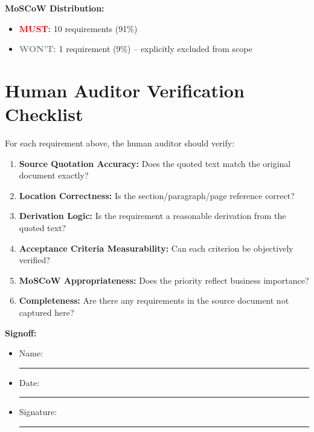 \vspace{1em}
\textbf{MoSCoW Distribution:}
\begin{itemize}
    \item \textcolor{red}{\textbf{MUST:}} 10 requirements (91\%)
    \item \textcolor{gray}{\textbf{WON'T:}} 1 requirement (9\%) -- explicitly excluded from scope
\end{itemize}

\section{Human Auditor Verification Checklist}
\label{sec:req-audit-checklist}

\begin{tcolorbox}[colback=yellow!10,colframe=yellow!50!black,title=\faIcon{clipboard-check} Auditor Verification Checklist]
For each requirement above, the human auditor should verify:

\begin{enumerate}[label=\faIcon{square}]
    \item \textbf{Source Quotation Accuracy:} Does the quoted text match the 
          original document exactly?
    \item \textbf{Location Correctness:} Is the section/paragraph/page reference correct?
    \item \textbf{Derivation Logic:} Is the requirement a reasonable derivation 
          from the quoted text?
    \item \textbf{Acceptance Criteria Measurability:} Can each criterion be 
          objectively verified?
    \item \textbf{MoSCoW Appropriateness:} Does the priority reflect business importance?
    \item \textbf{Completeness:} Are there any requirements in the source document 
          not captured here?
\end{enumerate}

\vspace{0.5em}
\textbf{Signoff:}
\begin{itemize}
    \item[] Name: \rule{6cm}{0.4pt}
    \item[] Date: \rule{3cm}{0.4pt}
    \item[] Signature: \rule{5cm}{0.4pt}
\end{itemize}
\end{tcolorbox}